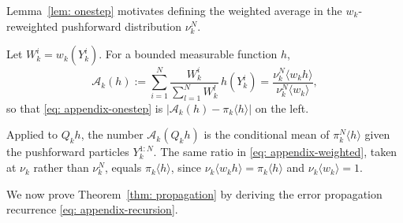 \documentclass{article}
\begin{document}
Lemma~\ref{lem: onestep} motivates defining the weighted average in the $w_k$-reweighted pushforward distribution $\nu_k^N$.
\begin{definition}
Let $W_k^i=w_k(Y_k^i)$. For a bounded measurable function $h$,
\begin{equation}
    \mathcal A_k(h) := \sum_{i=1}^{N}\frac{W_k^i}{\sum_{l=1}^{N}W_k^l}\,h(Y_k^i)
    = \frac{\nu_k^N\langle w_kh\rangle}{\nu_k^N\langle w_k\rangle} ,
    \label{eq: appendix-weighted}
\end{equation}
so that \eqref{eq: appendix-onestep} is $\bigl|\mathcal A_k(h)-\pi_k\langle h\rangle\bigr|$ on the left.
\end{definition}
Applied to $Q_kh$, the number $\mathcal A_k(Q_kh)$ is the conditional mean of $\pi_k^N\langle h\rangle$ given the pushforward particles $Y_k^{1:N}$. The same ratio in \eqref{eq: appendix-weighted}, taken at $\nu_k$ rather than $\nu_k^N$, equals $\pi_k\langle h\rangle$, since $\nu_k\langle w_kh\rangle = \pi_k\langle h\rangle$ and $\nu_k\langle w_k\rangle=1$.

We now prove Theorem~\ref{thm: propagation} by deriving the error propagation recurrence \eqref{eq: appendix-recursion}.
\end{document}
